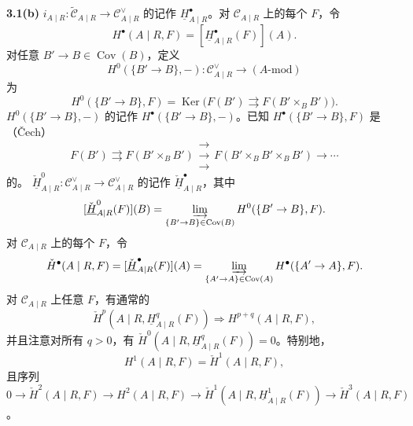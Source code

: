 \textbf{3.1(b)}  $i_{A\mid R}:\widetilde{\mathcal C}_{A\mid R}\to\mathcal C_{A\mid R}^{\vee}$ 的记作 $\underline H^{\bullet}_{A\mid R}$。对 $\mathcal C_{A\mid R}$ 上的每个 $F$，令
\[H^{\bullet}(A\mid R,F)=[\underline H^{\bullet}_{A\mid R}(F)](A).\]
对任意 $B'\to B\in\operatorname{Cov}(B)$，定义
\[H^0(\{B'\to B\},-):\mathcal C_{A\mid R}^{\vee}\longrightarrow(A\text{-mod})\]
为
\[H^0(\{B'\to B\},F)=\operatorname{Ker}\bigl(F(B')\rightrightarrows F(B'\mathbin{\times_B}B')\bigr).\]
$H^0(\{B'\to B\},-)$ 的记作 $H^{\bullet}(\{B'\to B\},-)$。已知 $H^{\bullet}(\{B'\to B\},F)$ 是（Čech）
\[
F(B')\rightrightarrows F(B'\mathbin{\times_B}B')\mathrel{\substack{\longrightarrow\\[-.8ex]\longrightarrow\\[-.8ex]\longrightarrow}} F(B'\mathbin{\times_B}B'\mathbin{\times_B}B')\longrightarrow\cdots
\]
的。 $\check{\underline H}^0_{A\mid R}:\mathcal C_{A\mid R}^{\vee}\to\mathcal C_{A\mid R}^{\vee}$ 的记作 $\check{\underline H}^{\bullet}_{A\mid R}$，其中
\[
[\check{\underline H}^0_{A\mid R}(F)](B)=\varinjlim_{\{B'\to B\}\in\operatorname{Cov}(B)}H^0(\{B'\to B\},F).
\]
对 $\mathcal C_{A\mid R}$ 上的每个 $F$，令
\[
\check H^{\bullet}(A\mid R,F)=[\check{\underline H}^{\bullet}_{A\mid R}(F)](A)
=\varinjlim_{\{A'\to A\}\in\operatorname{Cov}(A)}H^{\bullet}(\{A'\to A\},F).
\]
对 $\mathcal C_{A\mid R}$ 上任意 $F$，有通常的
\[\check H^p(A\mid R,\underline H^q_{A\mid R}(F))\Longrightarrow H^{p+q}(A\mid R,F),\]
并且注意对所有 $q>0$，有 $\check H^0(A\mid R,\underline H^q_{A\mid R}(F))=0$。特别地，
\[
H^1(A\mid R,F)=\check H^1(A\mid R,F),
\]
且序列
\[
0\to\check H^2(A\mid R,F)\to H^2(A\mid R,F)\to
\check H^1(A\mid R,\underline H^1_{A\mid R}(F))\to\check H^3(A\mid R,F)
\]
。

